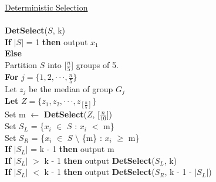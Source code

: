 \documentclass[12pt]{article}
\newcommand{\forceindent}{\leavevmode{\parindent=1em\indent}}
\begin{document}
{\large \underline{Deterministic Selection}\\
\\
\textbf{DetSelect}($S$, k)\\
\textbf{If} $|S|$ = 1 \textbf{then} output $x_1$\\
\textbf{Else}\\
\forceindent Partition $S$ into [$\frac{n}{5}$] groups of 5.\\
\forceindent \textbf{For} $j = \{1,2, \cdot \cdot \cdot, \frac{n}{5}\}$\\
\forceindent \forceindent Let $z_j$ be the median of group $G_j$\\
\forceindent \textbf{Let} $Z = \{z_1,z_2, \cdot \cdot \cdot, z_{[\frac{n}{5}]}\}$\\
\forceindent Set m $\leftarrow$ \textbf{DetSelect}($Z$, [$\frac{n}{10}$])\\
\forceindent Set $S_L$ = \{$x_i$ $\in$ $S$ : $x_i$ $<$ m\}\\
\forceindent Set $S_R$ = \{$x_i$ $\in$ $S$ $\setminus$ \{m\} : $x_i$ $\geq$ m\}\\
\forceindent \textbf{If} $|S_L|$ = k - 1 \textbf{then} output m\\
\forceindent \textbf{If} $|S_L|$ $>$ k - 1 \textbf{then} output \textbf{DetSelect}($S_L$, k)\\
\forceindent \textbf{If} $|S_L|$ $<$ k - 1 \textbf{then} output \textbf{DetSelect}($S_R$, k - 1 - $|S_L|$)
}\\
\end{document}

